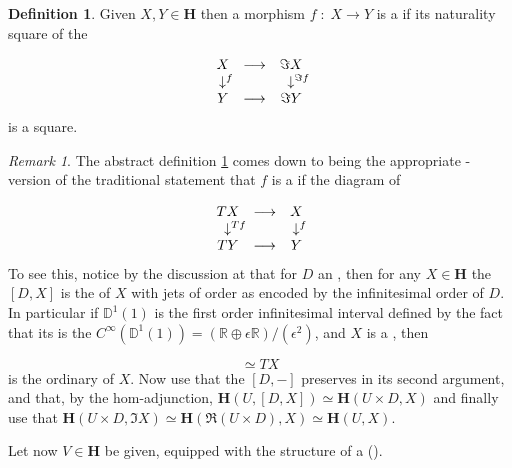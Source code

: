 \documentclass[12pt,titlepage]{article}
\def\mathrlap{\mathpalette\mathrlapinternal}
\def\mathrlapinternal#1#2{\rlap{$\mathsurround=0pt#1{#2}$}}
\newcommand{\itexarray}[1]{\begin{matrix}#1\end{matrix}}
\theoremstyle{plain}
\theoremstyle{definition}
\newtheorem{defn}{Definition}
\theoremstyle{remark}
\newtheorem{remark}{Remark}
\begin{document}
\begin{defn}
\label{LocalDiffeomorphisms}\hypertarget{LocalDiffeomorphisms}{}
Given $X,Y\in \mathbf{H}$ then a morphism $f \;\colon\; X\longrightarrow Y$ is a \emph{} if its naturality square of the 

\begin{displaymath}
\itexarray{
    X &\longrightarrow& \Im X
    \\
    \downarrow^{\mathrlap{f}} && \downarrow^{\mathrlap{\Im f}}
    \\
    Y &\longrightarrow& \Im Y
  }
\end{displaymath}
is a  square.

\end{defn}
\begin{remark}
\label{}\hypertarget{}{}
The abstract definition \ref{LocalDiffeomorphisms} comes down to being the appropriate -version of the traditional statement that $f$ is a  if the diagram of 

\begin{displaymath}
\itexarray{
    T X &\longrightarrow& X
    \\
    \downarrow^{\mathrlap{T f}} && \downarrow^{\mathrlap{f}}
    \\
    T Y &\longrightarrow& Y
  }
\end{displaymath}
To see this, notice by the discussion at \emph{} that for $D$ an , then for any $X \in \mathbf{H}$ the  $[D,X]$ is the  of $X$ with jets of order as encoded by the infinitesimal order of $D$. In particular if $\mathbb{D}^1(1)$ is the first order infinitesimal interval defined by the fact that its  is the  $C^\infty(\mathbb{D}^1(1)) = (\mathbb{R} \oplus \epsilon \mathbb{R})/(\epsilon^2)$, and $X$ is a , then

\begin{displaymath}
[\mathbb{D}^1(1), X]\simeq T X
\end{displaymath}
is the ordinary  of $X$. Now use that the  $[D,-]$ preserves  in its second argument, and that, by the hom-adjunction, $\mathbf{H}(U, [D,X]) \simeq \mathbf{H}(U \times D, X)$ and finally use that $\mathbf{H}(U \times D, \Im X)\simeq \mathbf{H}(\Re(U \times D), X)\simeq \mathbf{H}(U,X)$.

\end{remark}
Let now $V \in \mathbf{H}$ be given, equipped with the structure of a  ().
\end{document}
